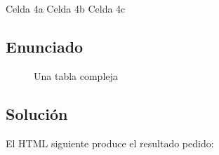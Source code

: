 \documentclass[letterpaper,10pt,spanish]{sphinxmanual}
\begin{document}
\begin{sphinxVerbatim}[commandchars=\\\{\}]
                         
                                        Celda 4a
                                        Celda 4b
                                        Celda 4c
\end{sphinxVerbatim}


\subsection{Enunciado}
\label{\detokenize{tema2:id8}}

\begin{figure}[htbp]
\centering
\capstart

\noindent{}
\caption{Una tabla compleja}\label{\detokenize{tema2:id17}}\end{figure}


\subsection{Solución}
\label{\detokenize{tema2:id9}}
El HTML siguiente produce el resultado pedido:
\end{document}
